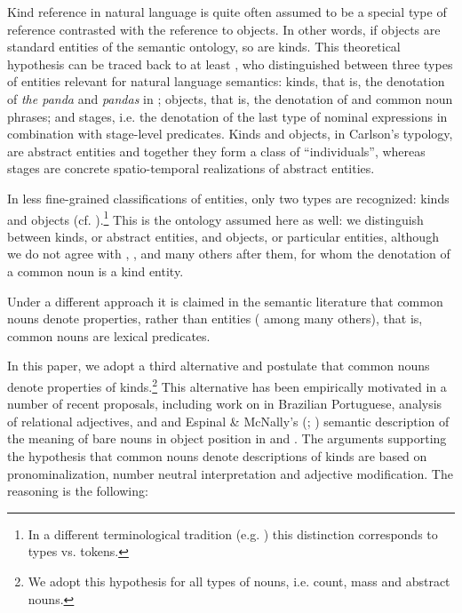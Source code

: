 \documentclass[output=paper
,modfonts
,nonflat]{langsci/langscibook}
\begin{document}
	Kind reference in natural language is quite often assumed to be a special type of reference contrasted with the reference to objects. In other words, if objects are standard entities of the semantic ontology, so are kinds. This theoretical hypothesis can be traced back to at least \citet{Carlson1977}, who distinguished between three types of entities relevant for natural language semantics: kinds, that is, the denotation of \textit{the panda} and \textit{pandas} in ; objects, that is, the denotation of  and common noun phrases; and stages, i.e. the denotation of the last type of nominal expressions in combination with stage-level predicates. Kinds and objects, in Carlson's typology, are abstract entities and together they form a class of ``individuals'', whereas stages are concrete spatio-temporal realizations of abstract entities. 
	
	In less fine-grained classifications of entities, only two types are recognized: kinds and objects (cf. \citealt{Zamparelli1995}).\footnote{In a different terminological tradition (e.g. \citealt{Vergnaud1992}) this distinction corresponds to types vs. tokens.} This is the ontology assumed here as well: we distinguish between kinds, or abstract entities, and objects, or particular entities, although we do not agree with \citet{Carlson1977}, \citet{Zamparelli1995}, and many others after them, for whom the denotation of a common noun is a kind entity. \newpage
	
	Under a different approach it is claimed in the semantic literature that common nouns denote properties, rather than entities (\citealt{Chierchia1984,Chierchia1998,Partee1987} among many others), that is, common nouns are lexical predicates. 
	
	In this paper, we adopt a third alternative and postulate that common nouns denote properties of kinds.\footnote{We adopt this hypothesis for all types of nouns, i.e. count, mass and abstract nouns.} This alternative has been empirically motivated in a number of recent proposals, including  work on  in Brazilian Portuguese,  analysis of relational adjectives, and  and Espinal \& McNally's (\citeyear{Espinal2007a}; \citeyear{Espinal2011})  semantic description of the meaning of bare nouns in object position in  and . The arguments supporting the hypothesis that common nouns denote descriptions of kinds are based on pronominalization, number neutral interpretation and adjective modification. The reasoning is the following: 
	
\end{document}
